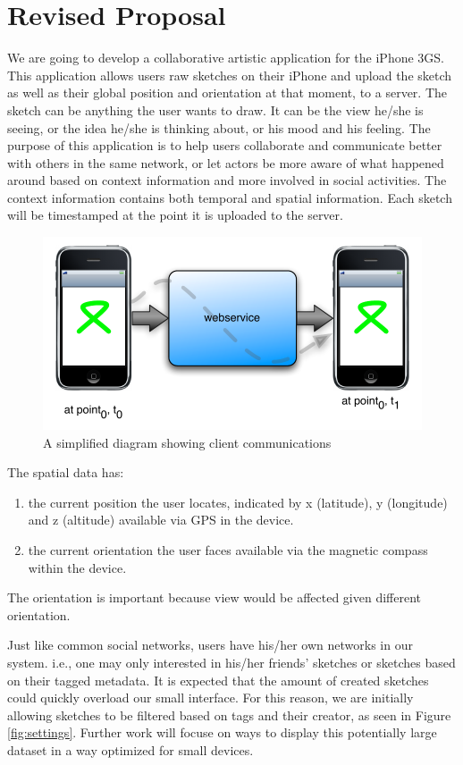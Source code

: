 \documentclass{www2010-submission}
\begin{document}
\section{ Revised Proposal }



We are going to develop a collaborative artistic application for the iPhone 3GS. This application allows users raw sketches on their iPhone and upload the sketch as well as their global position and orientation at that moment, to a server. The sketch can be anything the user wants to draw. It can be the view he/she is seeing, or the idea he/she is thinking about, or his mood and his feeling. The purpose of this application is to help users collaborate and communicate better with others in the same network, or let actors be more aware of what happened around based on context information and more involved in social activities. The context information contains both temporal and spatial information. Each sketch will be timestamped at the point it is uploaded to the server.

\begin{figure}
\centering
\includegraphics[width=.45\textwidth]{arch.pdf}
\caption{A simplified diagram showing client communications}
\label{fig:arch}
\end{figure}

The spatial data has:
\begin{enumerate}
\item the current position the user locates, indicated by x (latitude), y
	(longitude) and z (altitude) available via GPS in the device.
\item the current orientation the user faces available via the magnetic compass
	within the device.  
\end{enumerate}

The orientation is important because view would be affected given different
orientation.

Just like common social networks, users have his/her own networks in our
system. i.e., one may only interested in his/her friends' sketches or sketches
based on their tagged metadata.  It is expected that the amount of created
sketches could quickly overload our small interface.  For this reason, we are
initially allowing sketches to be filtered based on tags and their creator, as
seen in Figure \ref{fig:settings}.  Further work will focuse on ways to display
this potentially large dataset in a way optimized for small devices.
\end{document}
